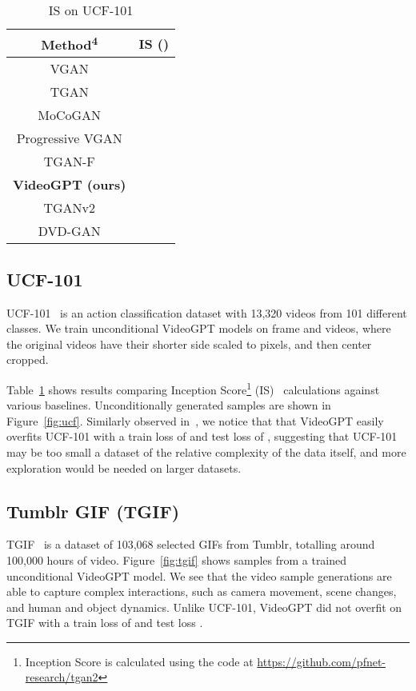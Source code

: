 \begin{table}[h]
            \centering
        
        \caption{IS on UCF-101}
        \label{table:ucf_is}
\begin{tabular}{@{}cc@{}}
\toprule
Method\textsuperscript{4} & IS ()                      \\ \midrule
VGAN                      &                       \\
TGAN                      &                      \\
MoCoGAN                   &                      \\
Progressive VGAN          &                      \\
TGAN-F                    & \multicolumn{1}{l}{} \\
\textbf{VideoGPT (ours)}  & \multicolumn{1}{l}{} \\
TGANv2                    & \multicolumn{1}{l}{} \\
DVD-GAN                   & \multicolumn{1}{l}{}  \\ \bottomrule
\end{tabular}
\end{table}

\subsection{UCF-101}
UCF-101~\citep{soomro2012ucf101} is an action classification dataset with 13,320 videos from 101 different classes. We train unconditional VideoGPT models on  frame  and  videos, where the original videos have their shorter side scaled to  pixels, and then center cropped. 

Table~\ref{table:ucf_is} shows results comparing Inception Score\footnote{Inception Score is calculated using the code at \url{https://github.com/pfnet-research/tgan2}} (IS)~\citep{salimans2016improved} calculations against various baselines. Unconditionally generated samples are shown in Figure~\ref{fig:ucf}. Similarly observed in~\cite{clark2019adversarial}, we notice that that VideoGPT easily overfits UCF-101 with a train loss of  and test loss of , suggesting that UCF-101 may be too small a dataset of the relative complexity of the data itself, and more exploration would be needed on larger datasets.

\subsection{Tumblr GIF (TGIF)}
TGIF~\citep{li2016tgif} is a dataset of 103,068 selected GIFs from Tumblr, totalling around 100,000 hours of video. Figure~\ref{fig:tgif} shows samples from a trained unconditional VideoGPT model. We see that the video sample generations are able to capture complex interactions, such as camera movement, scene changes, and human and object dynamics. Unlike UCF-101, VideoGPT did not overfit on TGIF with a train loss of  and test loss .

